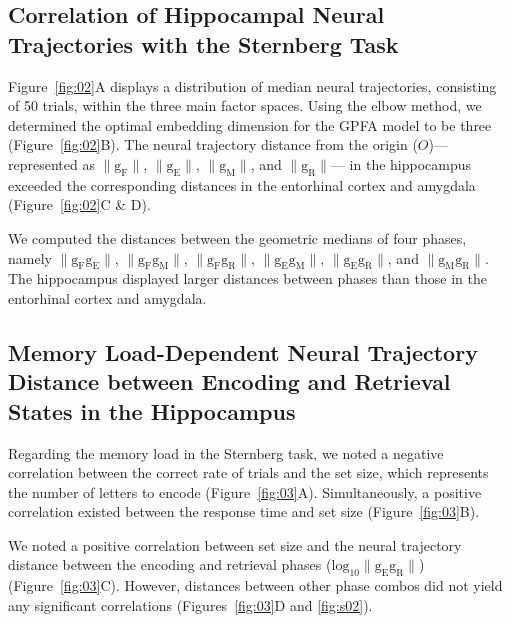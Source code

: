 \documentclass[final,3p,times,twocolumn]{elsarticle}
\begin{document}
\subsection{Correlation of Hippocampal Neural Trajectories with the Sternberg Task}
Figure~\ref{fig:02}A displays a distribution of median neural trajectories, consisting of 50 trials, within the three main factor spaces. Using the elbow method, we determined the optimal embedding dimension for the GPFA model to be three (Figure~\ref{fig:02}B). The neural trajectory distance from the origin ($O$)— represented as $\mathrm{\lVert g_{F} \rVert}$, $\mathrm{\lVert g_{E} \rVert}$, $\mathrm{\lVert g_{M} \rVert}$, and $\mathrm{\lVert g_{R} \rVert}$— in the hippocampus exceeded the corresponding distances in the entorhinal cortex and amygdala (Figure~\ref{fig:02}C \& D).

We computed the distances between the geometric medians of four phases, namely $\mathrm{\lVert g_{F}g_{E} \rVert}$, $\mathrm{\lVert g_{F}g_{M} \rVert}$, $\mathrm{\lVert g_{F}g_{R} \rVert}$, $\mathrm{\lVert g_{E}g_{M} \rVert}$, $\mathrm{\lVert g_{E}g_{R} \rVert}$, and $\mathrm{\lVert g_{M}g_{R} \rVert}$. The hippocampus displayed larger distances between phases than those in the entorhinal cortex and amygdala.

\subsection{Memory Load-Dependent Neural Trajectory Distance between Encoding and Retrieval States in the Hippocampus}

Regarding the memory load in the Sternberg task, we noted a negative correlation between the correct rate of trials and the set size, which represents the number of letters to encode (Figure~\ref{fig:03}A). Simultaneously, a positive correlation existed between the response time and set size (Figure~\ref{fig:03}B).

We noted a positive correlation between set size and the neural trajectory distance between the encoding and retrieval phases ($\mathrm{log_{10}\lVert g_{E}g_{R} \rVert}$) (Figure~\ref{fig:03}C). However, distances between other phase combos did not yield any significant correlations (Figures~\ref{fig:03}D and \ref{fig:s02}).
\end{document}
